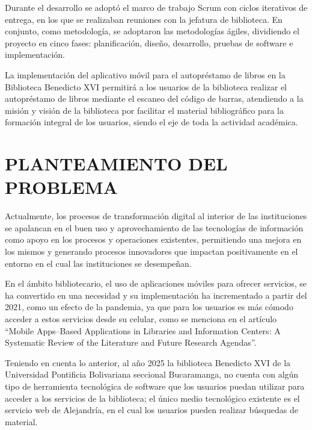 \documentclass[spanish]{ieee_upb}
\begin{document}
Durante el desarrollo se adoptó el marco de trabajo Scrum con ciclos iterativos de entrega, en los que se realizaban reuniones con la jefatura de biblioteca. En conjunto, como metodología, se adoptaron las metodologías ágiles, dividiendo el proyecto en cinco fases: planificación, diseño, desarrollo, pruebas de software e implementación.
\vspace{0.3 cm}

La implementación del aplicativo móvil para el autopréstamo de libros en la Biblioteca Benedicto XVI permitirá a los usuarios de la biblioteca realizar el autopréstamo de libros mediante el escaneo del código de barras, atendiendo a la misión y visión de la biblioteca por facilitar el material bibliográfico para la formación integral de los usuarios, siendo el eje de toda la actividad académica.
\vspace{0.3 cm}



\newpage
\section{PLANTEAMIENTO DEL PROBLEMA}
Actualmente, los procesos de  transformación digital al interior de las instituciones se apalancan en el buen uso y aprovechamiento de las tecnologías de información como apoyo en los procesos y operaciones existentes, permitiendo una mejora en los mismos y generando procesos innovadores que impactan positivamente en el entorno en el cual las instituciones se desempeñan.  
\vspace{0.3 cm}

En el ámbito bibliotecario, el uso de aplicaciones móviles para ofrecer servicios, se ha convertido en una necesidad y su implementación ha incrementado a partir del 2021, como un efecto de la pandemia, ya que para los usuarios es más cómodo acceder a estos servicios desde su celular, como se menciona en el artículo “Mobile Apps–Based Applications in Libraries and Information Centers: A Systematic Review of the Literature and Future Research Agendas”. \cite{singh2023mobile}
\vspace{0.3 cm}

Teniendo en cuenta lo anterior, al año 2025 la biblioteca Benedicto XVI de la Universidad Pontificia Bolivariana seccional Bucaramanga, no cuenta con algún tipo de herramienta tecnológica de software que los usuarios puedan utilizar para acceder a los servicios de la biblioteca; el único medio tecnológico existente es el servicio web de Alejandría, en el cual los usuarios pueden realizar búsquedas de material. 
\vspace{0.3 cm}
    
\end{document}
